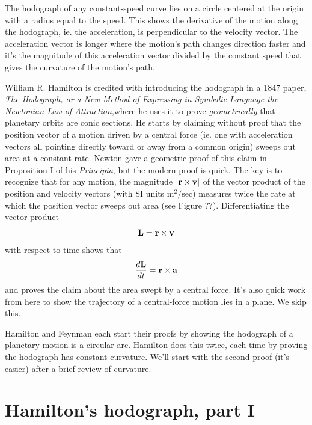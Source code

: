 \documentclass{ximera}
\begin{document}
The hodograph of any constant-speed curve lies on a circle centered at the origin with a radius equal to the speed. This shows the derivative of the motion along the hodograph, ie. the acceleration, is perpendicular to the velocity vector. The acceleration vector is longer where the motion's path changes direction faster and it's the magnitude of this acceleration vector divided by the constant speed that gives the curvature of the motion's path.

William R. Hamilton is credited with introducing the hodograph in a 1847 paper, \emph{The Hodograph, or a New Method of Expressing in Symbolic Language the Newtonian Law of Attraction},where he uses it to prove \emph{geometrically} that planetary orbits are conic sections. He starts by claiming without proof that the position vector of a motion driven by a central force (ie. one with acceleration vectors all pointing directly toward or away from a common origin) sweeps out area at a constant rate. Newton gave a geometric proof of this claim in Proposition I of his \emph{Principia}, but the modern proof is quick. The key is to recognize that for any motion, the magnitude $|{\bf r}\times {\bf v}|$ of the vector product of the position and velocity vectors (with SI units $\text{m}^2/\text{sec}$) measures twice the rate at which the position vector sweeps out area (see Figure ??). Differentiating the vector product
\[
        {\bf L} = {\bf r} \times {\bf v}
\]
with respect to time shows that
\[
  \frac{d{\bf L}}{dt} = {\bf r}\times {\bf a}
\]
and proves the claim about the area swept by a central force. It's also quick work from here to show the trajectory of a central-force motion lies in a plane. We skip this.

Hamilton and Feynman each start their proofs by showing the hodograph of a planetary motion is a circular arc. Hamilton does this twice, each time by proving the hodograph has constant curvature. We'll start with the second proof (it's easier) after a brief review of curvature.

\section*{Hamilton's hodograph, part I}

\end{document}
